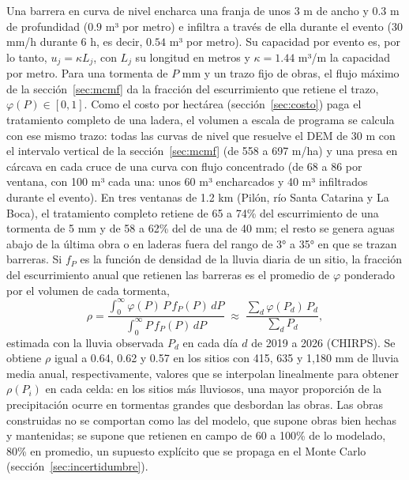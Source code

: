 \documentclass[11pt,letterpaper]{article}
\begin{document}
Una barrera en curva de nivel encharca una franja de unos 3 m de ancho y 0.3 m de profundidad ($0.9$ m³ por metro) e infiltra a través de ella durante el evento (30 mm/h durante 6 h, es decir, $0.54$ m³ por metro). Su capacidad por evento es, por lo tanto, $u_j = \kappa L_j$, con $L_j$ su longitud en metros y $\kappa = 1.44$ m³/m la capacidad por metro. Para una tormenta de $P$ mm y un trazo fijo de obras, el flujo máximo de la sección~\ref{sec:mcmf} da la fracción del escurrimiento que retiene el trazo, $\varphi(P)\in[0,1]$. Como el costo por hectárea (sección~\ref{sec:costo}) paga el tratamiento completo de una ladera, el volumen a escala de programa se calcula con ese mismo trazo: todas las curvas de nivel que resuelve el DEM de 30 m con el intervalo vertical de la sección~\ref{sec:mcmf} (de 558 a 697 m/ha) y una presa en cárcava en cada cruce de una curva con flujo concentrado (de 68 a 86 por ventana, con 100 m³ cada una: unos 60 m³ encharcados y 40 m³ infiltrados durante el evento). En tres ventanas de 1.2 km (Pilón, río Santa Catarina y La Boca), el tratamiento completo retiene de 65 a 74\% del escurrimiento de una tormenta de 5 mm y de 58 a 62\% del de una de 40 mm; el resto se genera aguas abajo de la última obra o en laderas fuera del rango de 3° a 35° en que se trazan barreras. Si $f_P$ es la función de densidad de la lluvia diaria de un sitio, la fracción del escurrimiento anual que retienen las barreras es el promedio de $\varphi$ ponderado por el volumen de cada tormenta,
\begin{equation}
\rho=\frac{\displaystyle\int_0^\infty \varphi(P)\,P\,f_P(P)\,dP}{\displaystyle\int_0^\infty P\,f_P(P)\,dP}\;\approx\;\frac{\sum_d \varphi(P_d)\,P_d}{\sum_d P_d},
\end{equation}
estimada con la lluvia observada $P_d$ en cada día $d$ de 2019 a 2026 (CHIRPS). Se obtiene $\rho$ igual a 0.64, 0.62 y 0.57 en los sitios con 415, 635 y 1,180 mm de lluvia media anual, respectivamente, valores que se interpolan linealmente para obtener $\rho(P_i)$ en cada celda: en los sitios más lluviosos, una mayor proporción de la precipitación ocurre en tormentas grandes que desbordan las obras. Las obras construidas no se comportan como las del modelo, que supone obras bien hechas y mantenidas; se supone que retienen en campo de 60 a 100\% de lo modelado, 80\% en promedio, un supuesto explícito que se propaga en el Monte Carlo (sección~\ref{sec:incertidumbre}).
\end{document}
